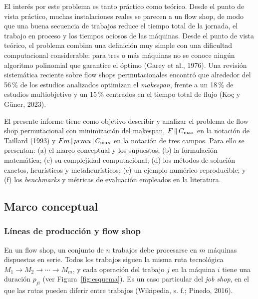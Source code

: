 El interés por este problema es tanto práctico como teórico. Desde el punto de
vista práctico, muchas instalaciones reales se parecen a un flow shop, de modo que
una buena secuencia de trabajos reduce el tiempo total de la jornada, el trabajo
en proceso y los tiempos ociosos de las máquinas. Desde el punto de vista teórico,
el problema combina una definición muy simple con una dificultad computacional
considerable: para tres o más máquinas no se conoce ningún algoritmo polinomial
que garantice el óptimo (Garey et al., 1976). Una revisión sistemática reciente
sobre flow shops permutacionales encontró que alrededor del 56\,\% de los estudios
analizados optimizan el \textit{makespan}, frente a un 18\,\% de estudios
multiobjetivo y un 15\,\% centrados en el tiempo total de flujo (Koç y Güner, 2023).

El presente informe tiene como objetivo describir y analizar el problema de flow
shop permutacional con minimización del makespan, $F\,\|\,C_{\max}$ en la notación de
Taillard (1993) y $Fm\,|\,prmu\,|\,C_{\max}$ en la notación de tres campos. Para ello se
presentan: (a) el marco conceptual y los supuestos; (b) la formulación matemática;
(c) su complejidad computacional; (d) los métodos de solución exactos, heurísticos
y metaheurísticos; (e) un ejemplo numérico reproducible; y (f) los \textit{benchmarks}
y métricas de evaluación empleados en la literatura.

\subsection{Marco conceptual}

\subsubsection{Líneas de producción y flow shop}

En un flow shop, un conjunto de $n$ trabajos debe procesarse en $m$ máquinas
dispuestas en serie. Todos los trabajos siguen la misma ruta tecnológica
$M_1 \rightarrow M_2 \rightarrow \cdots \rightarrow M_m$, y cada operación del trabajo
$j$ en la máquina $i$ tiene una duración $p_{ji}$ (ver Figura~\ref{fig:esquema}).
Es un caso particular del \textit{job shop}, en el que las rutas pueden diferir
entre trabajos (Wikipedia, s. f.; Pinedo, 2016).

